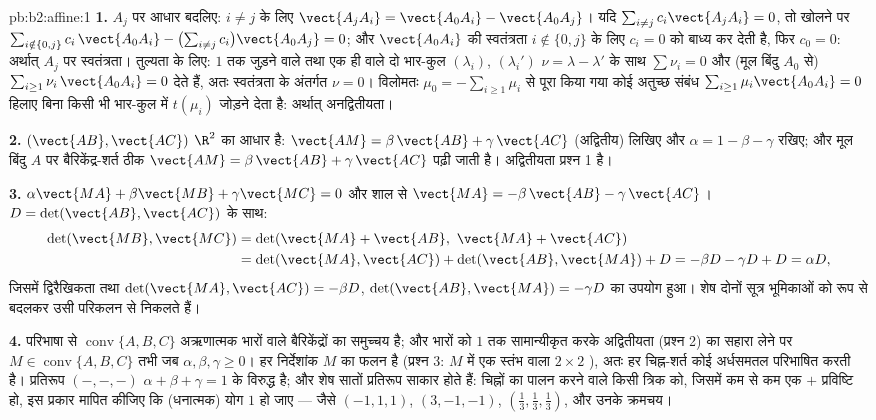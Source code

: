 \begin{solution}{pb:b2:affine:1}
\textbf{1.} $A_j$ पर आधार बदलिए: $i \neq j$ के लिए $\vect{A_jA_i} =
\vect{A_0A_i} - \vect{A_0A_j}$। यदि $\sum_{i \neq j}
c_i\vect{A_jA_i} = 0$, तो खोलने पर $\sum_{i \notin \{0,
j\}} c_i\,\vect{A_0A_i} - \bigl(\sum_{i\neq j}
c_i\bigr)\vect{A_0A_j} = 0$;
और $\vect{A_0A_i}$ की स्वतंत्रता $i \notin \{0, j\}$ के लिए $c_i = 0$ को बाध्य कर देती है, फिर $c_0 = 0$: अर्थात्
$A_j$ पर स्वतंत्रता। तुल्यता के लिए: $1$ तक जुड़ने वाले तथा एक ही
 वाले दो भार-कुल $(\lambda_i)$, $(\lambda_i')$ $\nu = \lambda -
\lambda'$ के साथ $\sum\nu_i = 0$ और (मूल बिंदु $A_0$
से) $\sum_{i \geq
1}\nu_i\,\vect{A_0A_i} = 0$ देते हैं, अतः स्वतंत्रता के अंतर्गत $\nu = 0$। विलोमतः $\mu_0 = -\sum_{i\geq1}
\mu_i$ से पूरा
किया गया कोई अतुच्छ संबंध $\sum_{i\geq1}\mu_i
\vect{A_0A_i} = 0$  हिलाए बिना किसी भी भार-कुल में
$t(\mu_i)$ जोड़ने देता है: अर्थात् अनद्वितीयता।

\textbf{2.} $(\vect{AB}, \vect{AC})$ $\R^2$ का आधार है: $\vect{AM} = \beta\,\vect{AB} + \gamma\,\vect{AC}$ (अद्वितीय) लिखिए और $\alpha = 1 - \beta - \gamma$ रखिए; और मूल
बिंदु $A$ पर बैरिकेंद्र-शर्त ठीक $\vect{AM} =
\beta\,\vect{AB} + \gamma\,\vect{AC}$ पढ़ी जाती है। अद्वितीयता प्रश्न 1 है।

\textbf{3.} $\alpha\vect{MA} + \beta\vect{MB} +
\gamma\vect{MC} = 0$ और शाल से $\vect{MA} =
-\beta\,\vect{AB} - \gamma\,\vect{AC}$। $D =
\det(\vect{AB}, \vect{AC})$ के साथ:
\begin{align*}
\det(\vect{MB}, \vect{MC})
&= \det(\vect{MA} + \vect{AB},\ \vect{MA} + \vect{AC})\\
&= \det(\vect{MA}, \vect{AC}) + \det(\vect{AB}, \vect{MA}) +
D = -\beta D - \gamma D + D = \alpha D,
\end{align*}
जिसमें द्विरैखिकता तथा $\det(\vect{MA}, \vect{AC}) = -\beta D$, $\det(\vect{AB}, \vect{MA}) = -\gamma D$ का उपयोग हुआ। शेष दोनों सूत्र भूमिकाओं को
 रूप से बदलकर उसी परिकलन से निकलते हैं।

\textbf{4.} परिभाषा से $\operatorname{conv}\{A, B, C\}$ अऋणात्मक भारों वाले बैरिकेंद्रों का समुच्चय है;
और भारों को $1$ तक सामान्यीकृत करके अद्वितीयता (प्रश्न 2) का सहारा लेने
पर $M \in \operatorname{conv}\{A,B,C\}$ तभी जब $\alpha, \beta,
\gamma \geq 0$। हर निर्देशांक $M$ का  फलन है (प्रश्न 3: $M$ में 
एक स्तंभ वाला $2\times2$ ), अतः हर  चिह्न-शर्त कोई  अर्धसमतल
परिभाषित करती है। प्रतिरूप $(-,-,-)$ $\alpha + \beta
+ \gamma = 1$ के विरुद्ध है; और शेष सातों प्रतिरूप
साकार होते हैं: चिह्नों का पालन करने वाले किसी त्रिक को, जिसमें कम से कम
एक $+$ प्रविष्टि हो, इस प्रकार मापित कीजिए कि (धनात्मक) योग $1$ हो जाए ---
जैसे $(-1, 1, 1)$, $(3, -1, -1)$, $(\frac13, \frac13, \frac13)$, और उनके क्रमचय।


\end{solution}
